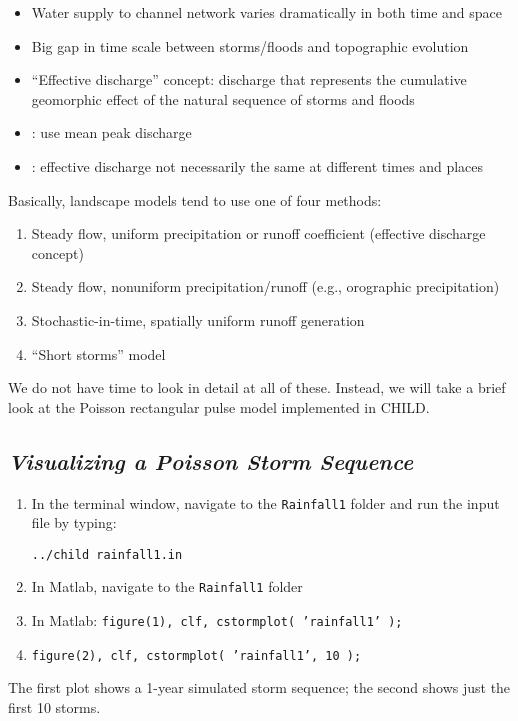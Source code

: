 \documentclass[12pt]{amsart}
\begin{document}
\begin{itemize}
\item Water supply to channel network varies dramatically in both time and space
\item Big gap in time scale between storms/floods and topographic evolution
\item ``Effective discharge'' concept: discharge that represents the cumulative geomorphic effect of the natural sequence of storms and floods
\item \citet{willgoose1991coupled}: use mean peak discharge
\item \citet{huang2006evaluation}: effective discharge not necessarily the same at different times and places
\end{itemize}
Basically, landscape models tend to use one of four methods:
\begin{enumerate}
\item Steady flow, uniform precipitation or runoff coefficient (effective discharge concept)
\item Steady flow, nonuniform precipitation/runoff (e.g., orographic precipitation)
\item Stochastic-in-time, spatially uniform runoff generation
\item ``Short storms'' model \citep{solyom2004effect}
\end{enumerate}
We do not have time to look in detail at all of these. Instead, we will take a brief look at the Poisson rectangular pulse model implemented in CHILD.

\subsection*{\em Visualizing a Poisson Storm Sequence}

{\em
\begin{enumerate}
\item
In the terminal window, navigate to the {\tt Rainfall1} folder and run the input file by typing:

{\tt ../child rainfall1.in}
\item
In Matlab, navigate to the {\tt Rainfall1} folder
\item
In Matlab: {\tt figure(1), clf, cstormplot( 'rainfall1' );}
\item
{\tt figure(2), clf, cstormplot( 'rainfall1', 10 );}
\end{enumerate}
The first plot shows a 1-year simulated storm sequence; the second shows just the first 10 storms.}
\end{document}
